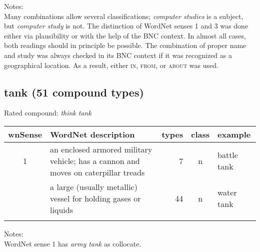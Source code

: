 \noindent
Notes:\\
Many combinations allow several classifications; \emph{computer studies} is a subject, but \emph{computer study} is not. The distinction of WordNet senses 1 and 3 was done either via plausibility or with the help of the BNC context. In almost all cases, both readings should in principle be possible. The combination of proper name and study was always checked in its BNC context if it was recognized as a geographical location. As a result, either \textsc{in}, \textsc{from}, or \textsc{about} was used.
\vspace*{-.3cm}
\subsection{tank      (51 compound types)}
Rated compound: \emph{think tank}
\vspace*{-.3cm}

\noindent
\begin{longtable}{c>{\raggedright\arraybackslash}p{5cm}rc>{\raggedright\arraybackslash}p{2cm}}\lsptoprule
{\small wnSense}&WordNet description&types&class&example\\\midrule
1&an enclosed armored military vehicle; has a cannon and moves on caterpillar treads&7&n&battle tank\\\tablevspace
2&a large (usually metallic) vessel for holding gases or liquids&44&n&water tank\\\lspbottomrule
\end{longtable}

\noindent
Notes:\\
WordNet sense 1 has \emph{army tank} as collocate.

